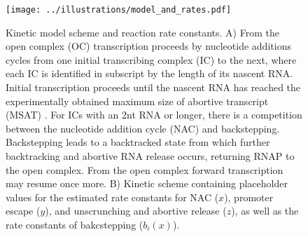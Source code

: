\begin{figure}
	\begin{center}
        \texttt{[image: ../illustrations/model\_and\_rates.pdf]}
	\end{center}
    \caption{Kinetic model scheme and reaction rate constants. A) From the
    open complex (OC) transcription proceeds by nucleotide additions cycles
    from one initial transcribing complex (IC) to the next, where each IC is
    identified in subscript by the length of its nascent RNA. Initial
    transcription proceeds until the nascent RNA has reached the
    experimentally obtained maximum size of abortive transcript (MSAT)
    \cite{hsu_initial_2006}. For ICs with an 2nt RNA or longer, there is a
    competition between the nucleotide addition cycle (NAC) and backstepping.
    Backstepping leads to a backtracked state from which further backtracking
    and abortive RNA release occurs, returning RNAP to the open complex. From
    the open complex forward transcription may resume once more. B) Kinetic
    scheme containing placeholder values for the estimated rate constants for NAC
    ($x$), promoter escape ($y$), and unscrunching and abortive release ($z$),
    as well as the rate constants of bakcstepping ($b_i(x)$).}
    \label{fig:model_and_rates}
\end{figure}

